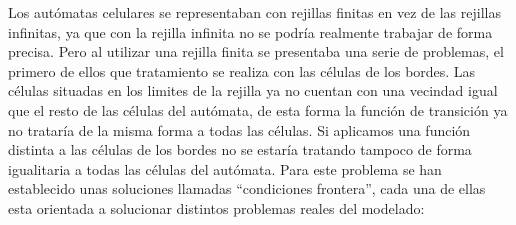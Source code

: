 Los autómatas celulares se representaban con rejillas finitas en vez de las rejillas infinitas, ya que con la rejilla infinita no se podría realmente trabajar de forma precisa. Pero al utilizar una rejilla finita se presentaba una serie de problemas, el primero de ellos que tratamiento se realiza con las células de los bordes. Las células situadas en los limites de la rejilla ya no cuentan con una vecindad igual que el resto de las células del autómata, de esta forma la función de transición ya no trataría de la misma forma a todas las células. Si aplicamos una función  distinta a las células de los bordes no se estaría tratando tampoco de forma igualitaria a todas las células del autómata. Para este problema se han establecido unas soluciones llamadas ``condiciones frontera'', cada una de ellas esta orientada a solucionar distintos problemas reales del modelado:

